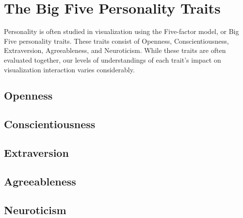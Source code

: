 \documentclass[conference]{IEEEtran}
\begin{document}





\section{The Big Five Personality Traits}
Personality is often studied in visualization using the Five-factor model, or
Big Five personality traits. These traits consist of Openness, Conscientiousness,
Extraversion, Agreeableness, and Neuroticism. While these traits are often
evaluated together, our levels of understandings of each trait's impact on visualization
interaction varies considerably.

\subsection{Openness}\label{Openness}
\subsection{Conscientiousness}\label{Conscientiousness}
\subsection{Extraversion}\label{Extraversion}
\subsection{Agreeableness}\label{Agreeableness}
\subsection{Neuroticism}\label{Neuroticism}


\vspace{12pt}
\end{document}
